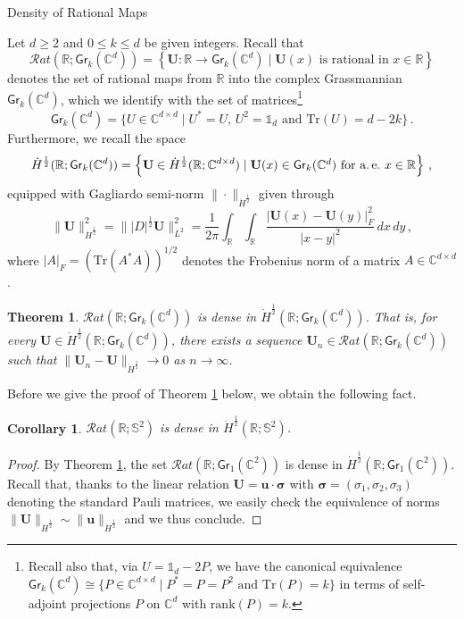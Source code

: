 \documentclass[11pt,reqno]{amsart}
\makeatletter
\newtheorem{cor}{Corollary}[section]
\newtheorem{thm}{Theorem}[section]
\theoremstyle{definition}
\theoremstyle{remark}
\theoremstyle{remark}
\numberwithin{equation}{section}
\newcommand{\C}{\mathbb{C}}
\newcommand{\R}{\mathbb{R}}
\newcommand{\Ss}{\mathbb{S}}
\newcommand{\rank}{\mathrm{rank}}
\newcommand{\uu}{\mathbf{u}}
\newcommand{\Ub}{\mathbf{U}}
\newcommand{\Tr}{\mathrm{Tr}}
\newcommand{\Gr}{\mathsf{Gr}}
\def\section{\@startsection{section}{1}%
  \z@{1.5\linespacing\@plus\linespacing}{.5\linespacing}%
  {\normalfont\bfseries\large\centering}}
\makeatother
\begin{document}

\begin{appendix} 

\section{Density of Rational Maps} \label{sec:app_density}

Let $d \geq 2$ and $0 \leq k \leq d$ be given integers. Recall that
$$
\mathcal{R}at(\R; \Gr_k(\C^d)) = \left \{ \Ub : \R \to \Gr_k(\C^d) \mid \mbox{$\Ub(x)$ is rational in $x\in \R$} \right \}
$$
denotes the set of rational maps from $\R$ into the complex Grassmannian $\Gr_k(\C^d)$, which we identify with the set of matrices\footnote{Recall also that, via $U = \mathds{1}_d - 2 P$, we have the canonical equivalence $\Gr_k(\C^d) \cong \{ P \in \C^{d \times d} \mid \mbox{$P^* = P = P^2$ and $\Tr(P) = k$} \}$ in terms of self-adjoint projections $P$ on $\C^d$ with $\rank(P)=k$.}
$$
\Gr_k(\C^d) = \{ U \in \C^{d \times d} \mid \mbox{$U^* = U$, $U^2 = \mathds{1}_d$ and $\Tr(U) = d-2k$} \} \, .
$$
Furthermore, we recall the space
$$
\dot{H}^{\frac 1 2}(\R; \Gr_k(\C^d)) = \left  \{ \Ub \in \dot{H}^{\frac 1 2}(\R; \C^{d \times d}) \mid \mbox{$\Ub(x) \in \Gr_k(\C^d)$ for a.\,e.~$x \in \R$} \right \} \, ,
$$
equipped with Gagliardo semi-norm $\| \cdot \|_{\dot{H}^{\frac 1 2}}$ given through 
$$
\| \Ub \|_{\dot{H}^{\frac 1 2}}^2 = \| |D|^{\frac 1 2} \Ub \|_{L^2}^2 =  \frac{1}{2 \pi} \int_{\R} \int_{\R} \frac{|\Ub(x)- \Ub(y)|_F^2}{|x-y|^2} \, dx \, dy \, ,
$$
where $|A|_F = (\Tr(A^* A))^{1/2}$ denotes the Frobenius norm of a matrix $A \in \C^{d \times d}$. 

\begin{thm} \label{thm:app_density}
 $\mathcal{R}at(\R; \Gr_k(\C^d))$ is dense in $\dot{H}^{\frac 1 2}(\R; \Gr_k(\C^d))$. That is, for every $\Ub \in \dot{H}^{\frac 1 2}(\R; \Gr_k(\C^d))$, there exists a sequence $\Ub_n \in \mathcal{R}at(\R; \Gr_k(\C^d))$ such that $\| \Ub_n - \Ub \|_{\dot{H}^{\frac 1 2}} \to 0$ as $n \to \infty$.
\end{thm}

Before we give the proof of Theorem \ref{thm:app_density} below, we obtain the following fact.

\begin{cor}
$\mathcal{R}at(\R; \Ss^2)$ is  dense in $\dot{H}^{\frac 1 2}(\R; \Ss^2)$.
\end{cor}

\begin{proof}
By Theorem \ref{thm:app_density}, the set $\mathcal{R}at(\R; \Gr_1(\C^2))$ is dense in $\dot{H}^{\frac 1 2}(\R; \Gr_1(\C^2))$. Recall that, thanks to  the linear relation $\Ub = \uu \cdot \bm{\sigma}$ with $\bm{\sigma}=(\sigma_1, \sigma_2, \sigma_3)$ denoting the standard Pauli matrices, we easily check the equivalence of norms $\| \Ub \|_{\dot{H}^{\frac 1 2}} \sim \| \uu \|_{\dot{H}^{\frac 1 2}}$ and we thus conclude.
\end{proof}



\end{appendix}
\end{document}

